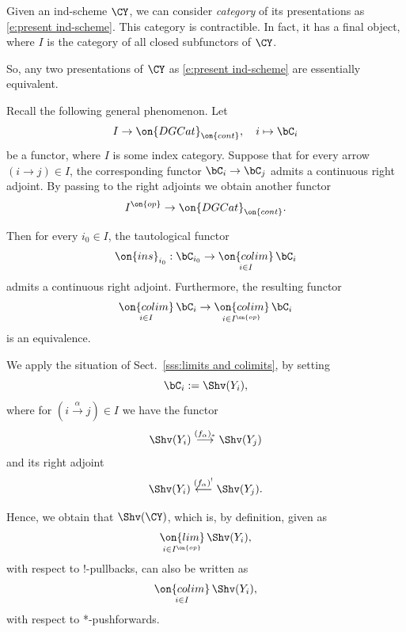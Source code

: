 \documentclass[9pt]{amsart}
\theoremstyle{definition}
\theoremstyle{remark}
\newcommand{\secref}[1]{Sect.~\ref{#1}}
\numberwithin{equation}{section}
\begin{document}
\sssec{}

Given an ind-scheme $\CY$, we can consider \emph{category} of its presentations as \eqref{e:present ind-scheme}. This category 
is contractible. In fact, it has a final object, where $I$ is the category of all closed subfunctors of $\CY$. 

\medskip

So, any two presentations of $\CY$ as \eqref{e:present ind-scheme} are essentially equivalent. 


%

\sssec{}  \label{sss:limits and colimits}

Recall the following general phenomenon. Let 
$$I\to \on{DGCat}_{\on{cont}}, \quad i\mapsto \bC_i$$ 
be a functor, where $I$ is some index category. Suppose that for every arrow $(i\to j)\in I$, the corresponding functor
$\bC_i\to \bC_j$ admits a continuous right adjoint. By passing to the right adjoints we obtain another functor
$$I^{\on{op}}\to \on{DGCat}_{\on{cont}}.$$

\medskip

Then for every $i_0\in I$, the tautological functor
$$\on{ins}_{i_0}:\bC_{i_0}\to \underset{i\in I}{\on{colim}}\, \bC_i$$
admits a continuous right adjoint. Furthermore, the resulting functor 
$$\underset{i\in I}{\on{colim}}\, \bC_i \to \underset{i\in I^{\on{op}}}{\on{colim}}\, \bC_i$$
is an equivalence. 

\sssec{}  \label{sss:shv on indsch}

We apply the situation of \secref{sss:limits and colimits}, by setting 
$$\bC_i:=\Shv(Y_i),$$
where for $(i\overset{\alpha}\to j)\in I$ we have the functor
$$\Shv(Y_i) \overset{(f_\alpha)_*}\longrightarrow \Shv(Y_j)$$
and its right adjoint
$$\Shv(Y_i) \overset{(f_\alpha)^!}\longleftarrow \Shv(Y_j).$$

Hence, we obtain that $\Shv(\CY)$, which is, by definition, given as
$$\underset{i\in I^{\on{op}}}{\on{lim}}\, \Shv(Y_i),$$
with respect to !-pullbacks, can also be written as
\begin{equation} \label{e:categ on indsch as colim}
\underset{i\in I}{\on{colim}}\, \Shv(Y_i),
\end{equation} 
with respect to *-pushforwards. 

\medskip
\end{document}

